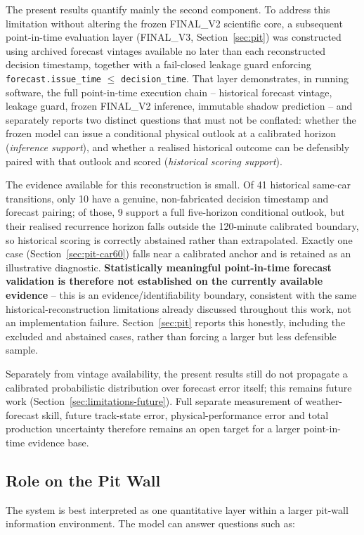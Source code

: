 The present results quantify mainly the second component. To address this limitation without altering the frozen FINAL\_V2 scientific core, a subsequent point-in-time evaluation layer (FINAL\_V3, Section~\ref{sec:pit}) was constructed using archived forecast vintages available no later than each reconstructed decision timestamp, together with a fail-closed leakage guard enforcing \texttt{forecast.issue\_time} $\le$ \texttt{decision\_time}. That layer demonstrates, in running software, the full point-in-time execution chain -- historical forecast vintage, leakage guard, frozen FINAL\_V2 inference, immutable shadow prediction -- and separately reports two distinct questions that must not be conflated: whether the frozen model can issue a conditional physical outlook at a calibrated horizon (\emph{inference support}), and whether a realised historical outcome can be defensibly paired with that outlook and scored (\emph{historical scoring support}).

The evidence available for this reconstruction is small. Of 41 historical same-car transitions, only 10 have a genuine, non-fabricated decision timestamp and forecast pairing; of those, 9 support a full five-horizon conditional outlook, but their realised recurrence horizon falls outside the 120-minute calibrated boundary, so historical scoring is correctly abstained rather than extrapolated. Exactly one case (Section~\ref{sec:pit-car60}) falls near a calibrated anchor and is retained as an illustrative diagnostic. \textbf{Statistically meaningful point-in-time forecast validation is therefore not established on the currently available evidence} -- this is an evidence/identifiability boundary, consistent with the same historical-reconstruction limitations already discussed throughout this work, not an implementation failure. Section~\ref{sec:pit} reports this honestly, including the excluded and abstained cases, rather than forcing a larger but less defensible sample.

Separately from vintage availability, the present results still do not propagate a calibrated probabilistic distribution over forecast error itself; this remains future work (Section~\ref{sec:limitations-future}). Full separate measurement of weather-forecast skill, future track-state error, physical-performance error and total production uncertainty therefore remains an open target for a larger point-in-time evidence base.

\subsection{Role on the Pit Wall}
The system is best interpreted as one quantitative layer within a larger pit-wall information environment. The model can answer questions such as:


